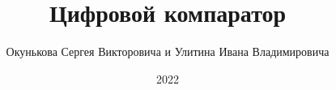 \documentclass[spec, och, labwork]{shiza}
\begin{document}
\chair{}

\title{Цифровой компаратор}






\author{Окунькова Сергея Викторовича и Улитина Ивана Владимировича}








\date{2022}

\maketitle

\end{document}
